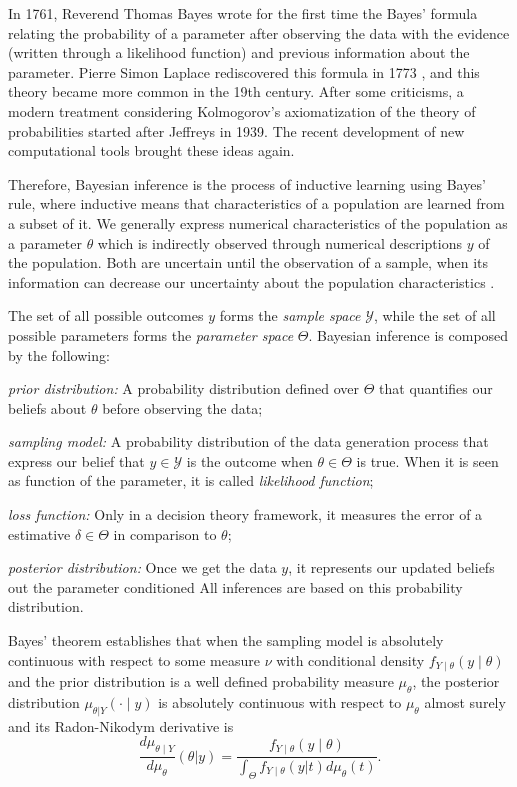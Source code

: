 In 1761, Reverend Thomas Bayes wrote for the first time the Bayes' formula
relating the probability of a parameter after observing the data with the
evidence (written through a likelihood function) and previous information
about the parameter. Pierre Simon Laplace rediscovered this formula in 1773
\cite{Robert2007}, and this theory became more common in the 19th century.
After some criticisms, a modern treatment considering Kolmogorov's
axiomatization of the theory of probabilities started after Jeffreys in 1939.
The recent development of new computational tools brought these ideas again.

Therefore, Bayesian inference is the process of inductive learning using
Bayes' rule, where inductive means that characteristics of a population are 
learned from a subset of it. We generally
express numerical characteristics of the population as a parameter $\theta$ which is
indirectly observed through numerical descriptions $y$ of the population. Both are
uncertain until the observation of a sample, when its information can decrease
our uncertainty about the population characteristics \cite[p. 1-2]{hoff2009first}.

The set of all possible outcomes $y$ forms the {\em sample space}
$\mathcal{Y}$, while the set of all possible parameters forms the {\em
parameter space} $\Theta$. Bayesian inference is composed by the following: 

\begin{alineas}
    \item {\em prior distribution:} A probability distribution defined over 
    $\Theta$ that quantifies our beliefs about $\theta$ before observing the data;
    \item {\em sampling model: } A probability distribution of the data generation process
    that express our belief that $y \in \mathcal{Y}$ is the outcome when
    $\theta \in \Theta$ is true. When it is seen as function of the parameter,
    it is called {\em likelihood function};
    \item {\em loss function:} Only in a decision theory framework, it
    measures the error of a estimative $\delta \in \Theta$ in comparison to
    $\theta$;
    \item {\em posterior distribution:} Once we get the data $y$, it
    represents our updated beliefs out the parameter conditioned All
    inferences are based on this probability distribution.
\end{alineas} 

Bayes' theorem establishes that when the sampling model is absolutely
continuous with respect to some measure $\nu$ with conditional density
$f_{Y\mid \theta}(y\mid\theta)$ and the prior distribution is a
well defined probability measure $\mu_{\theta}$, the posterior distribution
$\mu_{\theta|Y}(\cdot\mid y)$ is
absolutely continuous with respect to $\mu_{\theta}$ almost surely and its
Radon-Nikodym derivative is \cite[p. 16]{schervish2012theory}
\begin{equation}
  \label{eq:bayes-update-measure}
  \frac{d\mu_{\theta\mid Y}}{d\mu_{\theta}}(\theta|y) = \frac{f_{Y\mid \theta}(y\mid \theta)}{\int_{\Theta} f_{Y\mid\theta}(y|t)d\mu_{\theta}(t)}.  
\end{equation}


